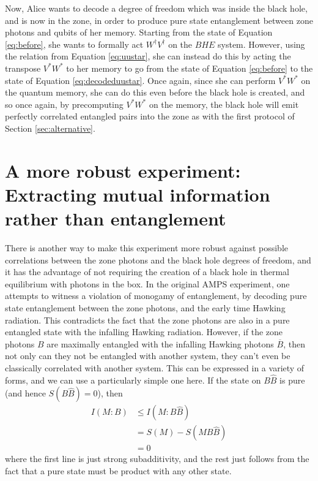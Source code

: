 \documentclass[12pt,a4paper]{article}
\begin{document}
Now, Alice wants to decode a degree of freedom which was inside the black hole, and is now in the zone, in order to produce pure state entanglement between zone photons and
qubits of her memory. Starting from the state of Equation \eqref{eq:before}, she wants to formally act $W^\dagger V^\dagger$ on the $BHE$ system. However, using the relation
from Equation \eqref{eq:uustar}, she can instead do this by acting the transpose $V^*W^*$ to her memory to go from the state of Equation \eqref{eq:before} to the state of Equation \eqref{eq:decodeduustar}. Once again, since she can perform  $V^*W^*$ on the quantum memory, she can do this even before the black hole is created, and so once again, by precomputing $V^*W^*$ on the memory, the black hole will emit perfectly correlated entangled pairs into the zone as with the first protocol of Section \ref{sec:alternative}. 




\section{A more robust experiment: Extracting mutual information rather than entanglement}
\label{sec:robust}

There is another way to make this experiment more robust against possible correlations between the zone photons and the black hole degrees of freedom, and it has the advantage of not requiring the creation of a black hole in thermal equilibrium with photons in the box. In the original AMPS experiment, one attempts to witness a violation of  monogamy of entanglement, by decoding pure state entanglement between the zone photons, and the early time Hawking radiation. This contradicts the fact that the zone photons are also in a pure entangled state with the infalling Hawking radiation. However, if the zone photons $B$ are maximally entangled with the infalling Hawking photons ${\overline B}$, then not only can they not be entangled with another system, they can't even be classically correlated with another system. This can be expressed in a variety of forms\cite{koashi2004monogamy}, and we can use a particularly simple one here. If the state on $B{\hat B}$ is pure (and hence $S(B{\hat B})=0$), then
\begin{align}
I(M:B)&\leq I(M:B\hat{B})\\
&=S(M)-S(MB\hat{B})\\
&=0
\end{align}
where the first line is just strong subadditivity, and the rest just follows from the fact that a pure state must be product with any other state.
\end{document}

